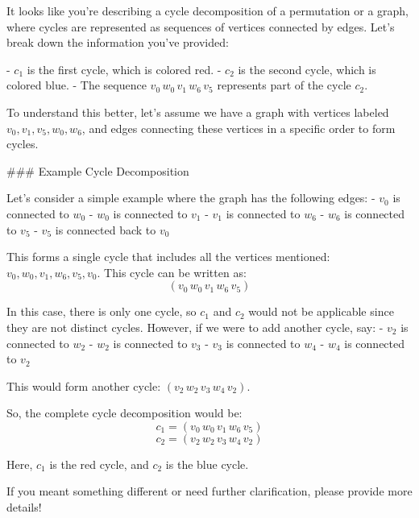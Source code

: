 It looks like you're describing a cycle decomposition of a permutation or a graph, where cycles are represented as sequences of vertices connected by edges. Let's break down the information you've provided:

- \( c_1 \) is the first cycle, which is colored red.
- \( c_2 \) is the second cycle, which is colored blue.
- The sequence \( v_0 \, w_0 \, v_1 \, w_6 \, v_5 \) represents part of the cycle \( c_2 \).

To understand this better, let's assume we have a graph with vertices labeled \( v_0, v_1, v_5, w_0, w_6 \), and edges connecting these vertices in a specific order to form cycles.

### Example Cycle Decomposition

Let's consider a simple example where the graph has the following edges:
- \( v_0 \) is connected to \( w_0 \)
- \( w_0 \) is connected to \( v_1 \)
- \( v_1 \) is connected to \( w_6 \)
- \( w_6 \) is connected to \( v_5 \)
- \( v_5 \) is connected back to \( v_0 \)

This forms a single cycle that includes all the vertices mentioned: \( v_0, w_0, v_1, w_6, v_5, v_0 \). This cycle can be written as:
\[ (v_0 \, w_0 \, v_1 \, w_6 \, v_5) \]

In this case, there is only one cycle, so \( c_1 \) and \( c_2 \) would not be applicable since they are not distinct cycles. However, if we were to add another cycle, say:
- \( v_2 \) is connected to \( w_2 \)
- \( w_2 \) is connected to \( v_3 \)
- \( v_3 \) is connected to \( w_4 \)
- \( w_4 \) is connected to \( v_2 \)

This would form another cycle: \( (v_2 \, w_2 \, v_3 \, w_4 \, v_2) \).

So, the complete cycle decomposition would be:
\[ c_1 = (v_0 \, w_0 \, v_1 \, w_6 \, v_5) \]
\[ c_2 = (v_2 \, w_2 \, v_3 \, w_4 \, v_2) \]

Here, \( c_1 \) is the red cycle, and \( c_2 \) is the blue cycle.

If you meant something different or need further clarification, please provide more details!